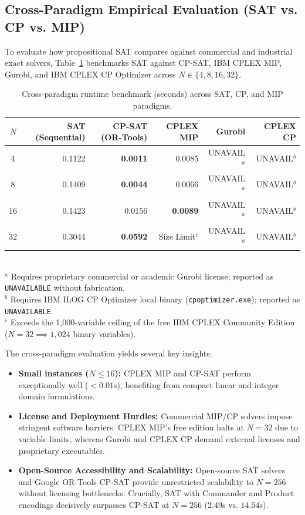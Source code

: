 \documentclass[a4paper,fleqn]{cas-sc}
\begin{document}
\subsection{Cross-Paradigm Empirical Evaluation (SAT vs. CP vs. MIP)}
To evaluate how propositional SAT compares against commercial and industrial exact solvers, Table~\ref{tab:cross_paradigm} benchmarks SAT against CP-SAT, IBM CPLEX MIP, Gurobi, and IBM CPLEX CP Optimizer across $N \in \{4, 8, 16, 32\}$.

\begin{table}[ht]
\centering
\caption{Cross-paradigm runtime benchmark (seconds) across SAT, CP, and MIP paradigms.}
\label{tab:cross_paradigm}
\begin{tabular*}{\tblwidth}{@{}crrrrr@{}}
\toprule
$N$ & SAT (Sequential) & CP-SAT (OR-Tools) & CPLEX MIP & Gurobi & CPLEX CP \\
\midrule
4  & 0.1122 & \textbf{0.0011} & 0.0085 & UNAVAIL$^a$ & UNAVAIL$^b$ \\
8  & 0.1409 & \textbf{0.0044} & 0.0066 & UNAVAIL$^a$ & UNAVAIL$^b$ \\
16 & 0.1423 & 0.0156 & \textbf{0.0089} & UNAVAIL$^a$ & UNAVAIL$^b$ \\
32 & 0.3044 & \textbf{0.0592} & Size Limit$^c$ & UNAVAIL$^a$ & UNAVAIL$^b$ \\
\bottomrule
\end{tabular*}
\vspace{1ex}
\footnotesize \\
$^a$ Requires proprietary commercial or academic Gurobi license; reported as \texttt{UNAVAILABLE} without fabrication. \\
$^b$ Requires IBM ILOG CP Optimizer local binary (\texttt{cpoptimizer.exe}); reported as \texttt{UNAVAILABLE}. \\
$^c$ Exceeds the 1,000-variable ceiling of the free IBM CPLEX Community Edition ($N=32 \implies 1,024$ binary variables).
\end{table}

The cross-paradigm evaluation yields several key insights:
\begin{itemize}
    \item \textbf{Small instances ($N \le 16$):} CPLEX MIP and CP-SAT perform exceptionally well ($< 0.01$s), benefiting from compact linear and integer domain formulations.
    \item \textbf{License and Deployment Hurdles:} Commercial MIP/CP solvers impose stringent software barriers. CPLEX MIP's free edition halts at $N = 32$ due to variable limits, whereas Gurobi and CPLEX CP demand external licenses and proprietary executables.
    \item \textbf{Open-Source Accessibility and Scalability:} Open-source SAT solvers and Google OR-Tools CP-SAT provide unrestricted scalability to $N = 256$ without licensing bottlenecks. Crucially, SAT with Commander and Product encodings decisively surpasses CP-SAT at $N = 256$ ($2.49$s vs. $14.54$s).
\end{itemize}
\end{document}
